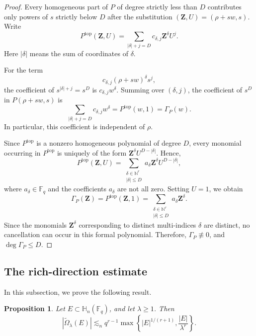 \documentclass[11pt,letterpaper]{amsart}
\numberwithin{equation}{section}
\newtheorem{proposition}[proposition]{Proposition}
\theoremstyle{definition}
\theoremstyle{remark}
\newcommand{\Fq}{\mathbb F_q}
\newcommand{\HH}{\mathbb H}
\begin{document}
\begin{proof}
Every homogeneous part of $P$ of degree strictly less than $D$ contributes only powers of $s$ strictly below $D$ after the substitution
$(\mathbf Z,U)=(\rho+sw,s)$. Write
\[
 P^{\mathrm{top}}(\mathbf Z,U)
 =
 \sum_{|\delta|+j=D}c_{\delta,j}\mathbf Z^\delta U^j.
\]
Here $|\delta|$ means the sum of coordinates of $\delta$. 

For the term
\[
 c_{\delta,j}(\rho+sw)^\delta s^j,
\]
the coefficient of $s^{|\delta|+j}=s^D$ is
$c_{\delta,j}w^\delta$. Summing over \((\delta,j)\), the coefficient of \(s^D\) in \(P(\rho+sw,s)\) is
\[
 \sum_{|\delta|+j=D}c_{\delta,j}w^\delta
 =P^{\mathrm{top}}(w,1)
 =\Gamma_P(w).
\]
In particular, this coefficient is independent of $\rho$.

Since \(P^{\mathrm{top}}\) is a nonzero homogeneous polynomial of
degree \(D\), every monomial occurring in \(P^{\mathrm{top}}\) is
uniquely of the form \(\mathbf Z^\delta U^{D-|\delta|}\). Hence,
\[
 P^{\mathrm{top}}(\mathbf Z,U)
 =
 \sum_{\substack{\delta\in\mathbb N^r\\|\delta|\leq D}}
 a_\delta \mathbf Z^\delta U^{D-|\delta|},
\]
where \(a_\delta\in\Fq\) and the coefficients \(a_\delta\) are not all
zero. Setting \(U=1\), we obtain
\[
 \Gamma_P(\mathbf Z)
 =
 P^{\mathrm{top}}(\mathbf Z,1)
 =
 \sum_{\substack{\delta\in\mathbb N^r\\|\delta|\leq D}}
 a_\delta\mathbf Z^\delta.
\]
Since the monomials \(\mathbf Z^\delta\) corresponding to distinct
multi-indices \(\delta\) are distinct, no cancellation can occur in
this formal polynomial. Therefore,
\(\Gamma_P\not\equiv 0\), and \(\deg\Gamma_P\leq D\).
\end{proof}





\subsection{The rich-direction estimate}
In this subsection, we prove the following result.
\begin{proposition}
\label{prop:polynomial-rich-line}
Let $E\subset\HH_n(\Fq)$, and let $\lambda\geq1$.  Then
\begin{equation}\label{eq:polynomial-rich-line}
 |\widetilde\Omega_\lambda(E)|
 \lesssim_n
 q^{r-1}
 \max\left\{
 |E|^{1/(r+1)},\frac{|E|}{\lambda^r}
 \right\}.
\end{equation}
\end{proposition}
\end{document}
